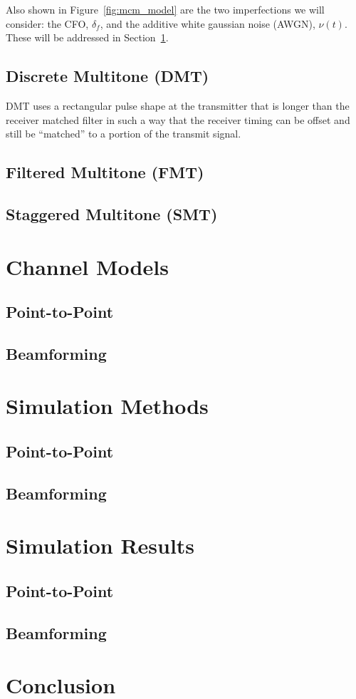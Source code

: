 \documentclass[conference]{IEEEtran}
\begin{document}
Also shown in Figure~\ref{fig:mcm_model} are the two imperfections we will 
consider: the CFO, $\delta_f$, and the additive white gaussian noise (AWGN),
$\nu(t)$. These will be addressed in Section~\ref{sec:Models}.

\subsection{Discrete Multitone (DMT)}

DMT uses a rectangular pulse shape at the transmitter that is longer than the
receiver matched filter in such a way that the receiver timing can be offset
and still be ``matched'' to a portion of the transmit signal. 

\subsection{Filtered Multitone (FMT)}

\subsection{Staggered Multitone (SMT)}

\section{Channel Models}
\label{sec:Models}

\subsection{Point-to-Point}
\subsection{Beamforming}

\section{Simulation Methods}
\label{sec:Methods}

\subsection{Point-to-Point}
\subsection{Beamforming}

\section{Simulation Results}
\label{sec:Results}

\subsection{Point-to-Point}
\subsection{Beamforming}

\section{Conclusion}
\label{sec:Conclusion}
\end{document}
